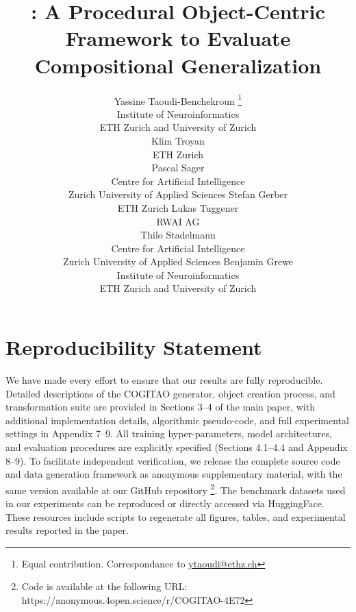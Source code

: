 \documentclass{article}
\title{\generatorName: A Procedural Object-Centric Framework to Evaluate Compositional Generalization}
\author{Yassine Taoudi-Benchekroun \thanks{Equal contribution. Correspondance to \href{mailto:ytaoudi@ethz.ch}{ytaoudi@ethz.ch}}\\
  Institute of Neuroinformatics \\
  ETH Zurich and University of Zurich \\
  \And
  Klim Troyan \footnotemark[1] \\
  ETH Zurich \\
  \And
  Pascal Sager \\
  Centre for Artificial Intelligence \\
  Zurich University of Applied Sciences
  \AND
  Stefan Gerber \\
  ETH Zurich
  \And
  Lukas Tuggener \\
  RWAI AG \\
  \And
  Thilo Stadelmann \\
  Centre for Artificial Intelligence \\
  Zurich University of Applied Sciences
  \AND
  Benjamin Grewe \\
  Institute of Neuroinformatics \\
  ETH Zurich and University of Zurich \\
}
\begin{document}
\maketitle

\begin{abstract}

\end{abstract}







\section{Reproducibility Statement}

We have made every effort to ensure that our results are fully reproducible. Detailed descriptions of the COGITAO generator, object creation process, and transformation suite are provided in Sections 3–4 of the main paper, with additional implementation details, algorithmic pseudo-code, and full experimental settings in Appendix 7–9. All training hyper-parameters, model architectures, and evaluation procedures are explicitly specified (Sections 4.1–4.4 and Appendix 8–9). To facilitate independent verification, we release the complete source code and data generation framework as anonymous supplementary material, with the same version available at our GitHub  repository \footnote{Code is available at the following URL: https://anonymous.4open.science/r/COGITAO-4E72}. The benchmark datasets used in our experiments can be reproduced or directly accessed via HuggingFace. These resources include scripts to regenerate all figures, tables, and experimental results reported in the paper. 




  
  

\clearpage
\appendix


% 
\clearpage
% 
\end{document}
